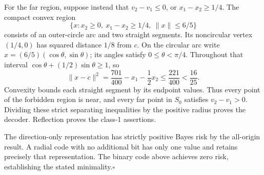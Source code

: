 For the far region, suppose instead that $v_2-v_1\leq0$, or $x_1-x_2\geq1/4$. The compact convex region
\[
 \{x:x_2\geq0,\ x_1-x_2\geq1/4,\ \|x\|\leq6/5\}
\]
consists of an outer-circle arc and two straight segments. Its noncircular vertex $(1/4,0)$ has squared distance $1/8$ from $c$. On the circular arc write $x=(6/5)(\cos\theta,\sin\theta)$; its angles satisfy $0\leq\theta<\pi/4$. Throughout that interval $\cos\theta+(1/2)\sin\theta\geq1$, so
\[
 \|x-c\|^2=\frac{701}{400}-x_1-\frac12x_2
 \leq\frac{221}{400}<\frac{16}{25}.
\]
Convexity bounds each straight segment by its endpoint values. Thus every point of the forbidden region is near, and every far point in $S_0$ satisfies $v_2-v_1>0$. Dividing these strict separating inequalities by the positive radius proves the decoder. Reflection proves the class-1 assertions.

The direction-only representation has strictly positive Bayes risk by the all-origin result. A radial code with no additional bit has only one value and retains precisely that representation. The binary code above achieves zero risk, establishing the stated minimality.\hfill$\square$
